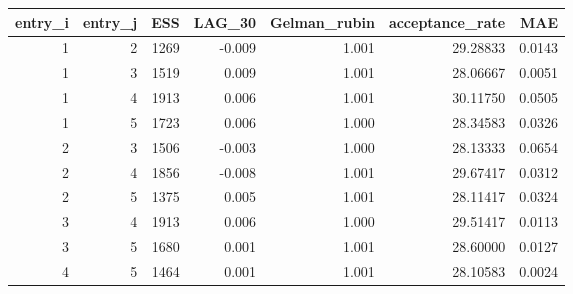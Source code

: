 \begin{longtable}{rrrrrrr}
\toprule
entry\_i & entry\_j & ESS & LAG\_30 & Gelman\_rubin & acceptance\_rate & MAE \\ 
\midrule
1 & 2 & 1269 & -0.009 & 1.001 & 29.28833 & 0.0143 \\ 
1 & 3 & 1519 & 0.009 & 1.001 & 28.06667 & 0.0051 \\ 
1 & 4 & 1913 & 0.006 & 1.001 & 30.11750 & 0.0505 \\ 
1 & 5 & 1723 & 0.006 & 1.000 & 28.34583 & 0.0326 \\ 
2 & 3 & 1506 & -0.003 & 1.000 & 28.13333 & 0.0654 \\ 
2 & 4 & 1856 & -0.008 & 1.001 & 29.67417 & 0.0312 \\ 
2 & 5 & 1375 & 0.005 & 1.001 & 28.11417 & 0.0324 \\ 
3 & 4 & 1913 & 0.006 & 1.000 & 29.51417 & 0.0113 \\ 
3 & 5 & 1680 & 0.001 & 1.001 & 28.60000 & 0.0127 \\ 
4 & 5 & 1464 & 0.001 & 1.001 & 28.10583 & 0.0024 \\ 
\bottomrule
\end{longtable}

